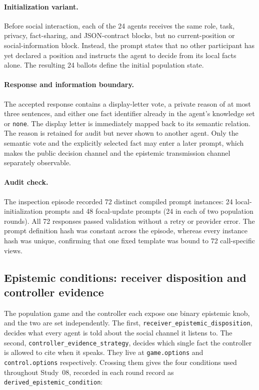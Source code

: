 \paragraph{Initialization variant.}
Before social interaction, each of the 24 agents receives the same role, task,
privacy, fact-sharing, and JSON-contract blocks, but no current-position or
social-information block. Instead, the prompt states that no other participant
has yet declared a position and instructs the agent to decide from its local
facts alone. The resulting 24 ballots define the initial population state.

\paragraph{Response and information boundary.}
The accepted response contains a display-letter vote, a private reason of at
most three sentences, and either one fact identifier already in the agent's
knowledge set or \texttt{none}. The display letter is immediately mapped back
to its semantic relation. The reason is retained for audit but never shown to
another agent. Only the semantic vote and the explicitly selected fact may
enter a later prompt, which makes the public decision channel and the epistemic
transmission channel separately observable.

\paragraph{Audit check.}
The inspection episode recorded 72 distinct compiled prompt instances: 24
local-initialization prompts and 48 focal-update prompts (24 in each of two
population rounds). All 72 responses passed validation without a retry or
provider error. The prompt definition hash was constant across the episode,
whereas every instance hash was unique, confirming that one fixed template was
bound to 72 call-specific views.

\subsection{Epistemic conditions: receiver disposition and controller evidence}
\label{app:relational-epistemic-conditions}

The population game and the controller each expose one binary epistemic knob,
and the two are set independently. The first,
\texttt{receiver\_epistemic\_disposition}, decides what every agent is told
about the social channel it listens to. The second,
\texttt{controller\_evidence\_strategy}, decides which single fact the
controller is allowed to cite when it speaks. They live at
\texttt{game.options} and \texttt{control.options} respectively. Crossing them
gives the four conditions used throughout Study~08, recorded in each round
record as \texttt{derived\_epistemic\_condition}:

